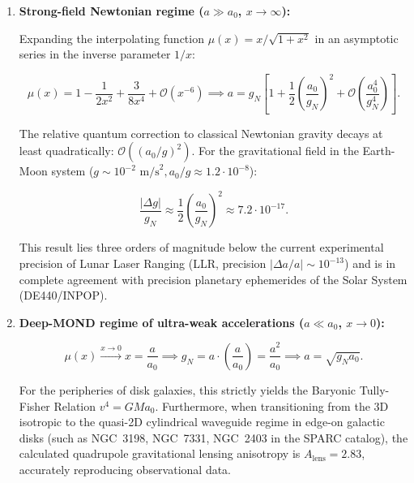 \begin{enumerate}
\item \textbf{Strong-field Newtonian regime ($a \gg a_0$, $x \to \infty$):}

Expanding the interpolating function $\mu(x) = x/\sqrt{1+x^2}$ in an asymptotic series in the inverse parameter $1/x$:

\begin{equation}\label{eq:4.12}\tag{4.12}
\mu(x) = 1 - \frac{1}{2x^2} + \frac{3}{8x^4} + \mathcal{O}(x^{-6}) \implies a = g_N \left[ 1 + \frac{1}{2}\left( \frac{a_0}{g_N} \right)^2 + \mathcal{O}\left( \frac{a_0^4}{g_N^4} \right) \right].
\end{equation}

The relative quantum correction to classical Newtonian gravity decays at least quadratically: $\mathcal{O}((a_0/g)^2)$. For the gravitational field in the Earth-Moon system ($g \sim 10^{-2}\text{ m/s}^2, a_0/g \approx 1.2 \cdot 10^{-8}$):

\begin{equation}\label{eq:4.12a}\tag{4.12a}
\frac{|\Delta g|}{g_N} \approx \frac{1}{2} \left( \frac{a_0}{g_N} \right)^2 \approx 7.2 \cdot 10^{-17}.
\end{equation}

This result lies three orders of magnitude below the current experimental precision of Lunar Laser Ranging (LLR, precision $|\Delta a/a| \sim 10^{-13}$) and is in complete agreement with precision planetary ephemerides of the Solar System (DE440/INPOP).

\item \textbf{Deep-MOND regime of ultra-weak accelerations ($a \ll a_0$, $x \to 0$):}

\begin{equation}\label{eq:4.13}\tag{4.13}
\mu(x) \xrightarrow{x \to 0} x = \frac{a}{a_0} \implies g_N = a \cdot \left(\frac{a}{a_0}\right) = \frac{a^2}{a_0} \implies a = \sqrt{g_N a_0}.
\end{equation}

For the peripheries of disk galaxies, this strictly yields the Baryonic Tully-Fisher Relation $v^4 = G M a_0$. Furthermore, when transitioning from the 3D isotropic to the quasi-2D cylindrical waveguide regime in edge-on galactic disks (such as NGC~3198, NGC~7331, NGC~2403 in the SPARC catalog), the calculated quadrupole gravitational lensing anisotropy is $A_{\text{lens}} = 2.83$, accurately reproducing observational data.
\end{enumerate}

